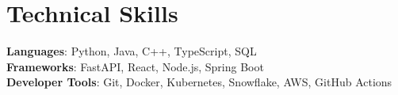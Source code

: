 \documentclass[letterpaper,11pt]{article}
\begin{document}
\section{Technical Skills}
 \begin{itemize}[leftmargin=0.15in, label={}]
    \small{\item{
     \textbf{Languages}{: Python, Java, C++, TypeScript, SQL} \\
     \textbf{Frameworks}{: FastAPI, React, Node.js, Spring Boot} \\
     \textbf{Developer Tools}{: Git, Docker, Kubernetes, Snowflake, AWS, GitHub Actions}
    }}
 \end{itemize}
\end{document}
